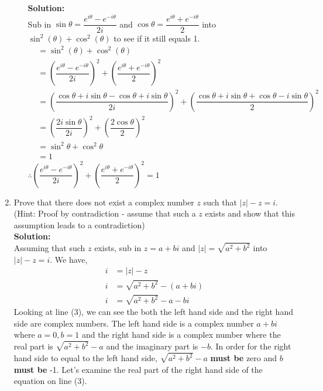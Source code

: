 \documentclass[12pt]{book}
\begin{document}
\begin{enumerate}
\begin{enumerate}
\textbf{Solution:}\\
Sub in $\sin\theta =\dfrac{e^{i\theta} - e^{-i\theta}}{2i}$ and $ \cos\theta = \dfrac{e^{i\theta} + e^{-i\theta}}{2}$ into $\sin^2(\theta) + \cos^2(\theta)$ to see if it still equals 1.
\setcounter{equation}{0}
\begin{align}
    &= \sin^2(\theta) + \cos^2(\theta) \\
    &= \left(\dfrac{e^{i\theta} - e^{-i\theta}}{2i}\right)^2 + \left(\dfrac{e^{i\theta} + e^{-i\theta}}{2} \right)^2 \\
    &= \left(\dfrac{\cos\theta + i\sin\theta - \cos\theta + i\sin\theta}{2i}\right)^2 + \left(\dfrac{\cos\theta + i\sin\theta + \cos\theta - i\sin\theta}{2} \right)^2  \\
    &= \left(\dfrac{2i\sin\theta}{2i}\right)^2 + \left(\dfrac{2\cos\theta}{2} \right)^2  \\
    &= \sin^2\theta + \cos^2\theta \\
    &= 1
\end{align}
$\therefore \left(\dfrac{e^{i\theta} - e^{-i\theta}}{2i}\right)^2 + \left(\dfrac{e^{i\theta} + e^{-i\theta}}{2} \right)^2 = 1$







\end{enumerate}

\newpage

\item Prove that there does not exist a complex number $z$ such that $|z| - z = i$.\\

\vspace{0.2cm}
(Hint: Proof by contradiction - assume that such a $z$ exists and show that this assumption leads to a contradiction)\\

\textbf{Solution:}\\
Assuming that such $z$ exists, sub in $z = a+bi$ and $|z| = \sqrt{a^2+b^2}$ into $|z| - z = i$. We have,\\
\setcounter{equation}{0}
\begin{align}
    i &=|z| - z \\
    i &= \sqrt{a^2+b^2} - (a+bi) \\
    i &= \sqrt{a^2+b^2} - a - bi 
\end{align}
Looking at line (3), we can see the both the left hand side and the right hand side are complex numbers. The left hand side is a complex number $a +bi$ where $a = 0, b = 1$ and the right hand side is a complex number where the real part is $\sqrt{a^2+b^2} - a$ and the imaginary part is $-b$. In order for the right hand side to equal to the left hand side, $\sqrt{a^2+b^2} - a$ \textbf{must be} zero and $b$ \textbf{must be} -1. Let's examine the real part of the right hand side of the equation on line (3).\\


\end{enumerate}
\end{document}
